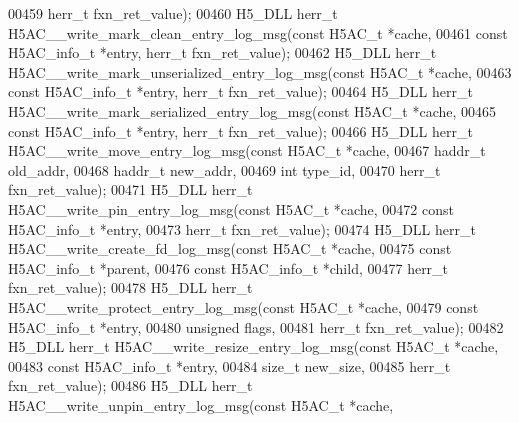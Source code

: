 \begin{DoxyCode}
00459                                                    herr\_t fxn\_ret\_value);
00460 H5\_DLL herr\_t H5AC\_\_write\_mark\_clean\_entry\_log\_msg(\textcolor{keyword}{const} H5AC\_t *cache,
00461     \textcolor{keyword}{const} H5AC\_info\_t *entry, herr\_t fxn\_ret\_value);
00462 H5\_DLL herr\_t H5AC\_\_write\_mark\_unserialized\_entry\_log\_msg(\textcolor{keyword}{const} H5AC\_t *cache,
00463         \textcolor{keyword}{const} H5AC\_info\_t *entry, herr\_t fxn\_ret\_value);
00464 H5\_DLL herr\_t H5AC\_\_write\_mark\_serialized\_entry\_log\_msg(\textcolor{keyword}{const} H5AC\_t *cache,
00465     \textcolor{keyword}{const} H5AC\_info\_t *entry, herr\_t fxn\_ret\_value);
00466 H5\_DLL herr\_t H5AC\_\_write\_move\_entry\_log\_msg(\textcolor{keyword}{const} H5AC\_t *cache,
00467                                              haddr\_t old\_addr,
00468                                              haddr\_t new\_addr,
00469                                              \textcolor{keywordtype}{int} type\_id,
00470                                              herr\_t fxn\_ret\_value);
00471 H5\_DLL herr\_t H5AC\_\_write\_pin\_entry\_log\_msg(\textcolor{keyword}{const} H5AC\_t *cache,
00472                                             \textcolor{keyword}{const} H5AC\_info\_t *entry,
00473                                             herr\_t fxn\_ret\_value);
00474 H5\_DLL herr\_t H5AC\_\_write\_create\_fd\_log\_msg(\textcolor{keyword}{const} H5AC\_t *cache,
00475                                             \textcolor{keyword}{const} H5AC\_info\_t *parent,
00476                                             \textcolor{keyword}{const} H5AC\_info\_t *child,
00477                                             herr\_t fxn\_ret\_value);
00478 H5\_DLL herr\_t H5AC\_\_write\_protect\_entry\_log\_msg(\textcolor{keyword}{const} H5AC\_t *cache,
00479                                                 \textcolor{keyword}{const} H5AC\_info\_t *entry,
00480                                                 \textcolor{keywordtype}{unsigned} flags,
00481                                                 herr\_t fxn\_ret\_value);
00482 H5\_DLL herr\_t H5AC\_\_write\_resize\_entry\_log\_msg(\textcolor{keyword}{const} H5AC\_t *cache,
00483                                                \textcolor{keyword}{const} H5AC\_info\_t *entry,
00484                                                \textcolor{keywordtype}{size\_t} new\_size,
00485                                                herr\_t fxn\_ret\_value);
00486 H5\_DLL herr\_t H5AC\_\_write\_unpin\_entry\_log\_msg(\textcolor{keyword}{const} H5AC\_t *cache,

\end{DoxyCode}
